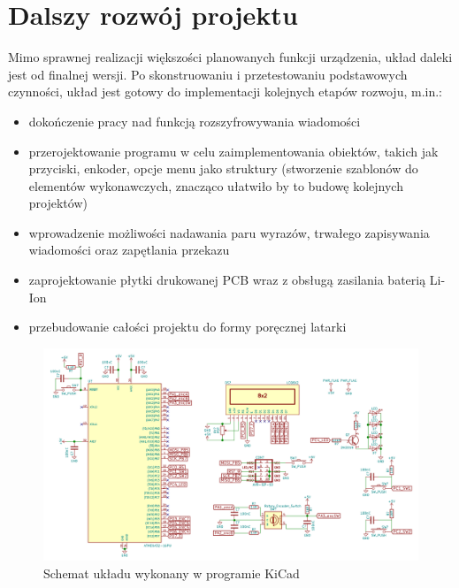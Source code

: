 \documentclass{article}
\begin{document}
\section{Dalszy rozwój projektu}
Mimo sprawnej realizacji większości planowanych funkcji urządzenia, układ daleki jest od finalnej wersji. Po skonstruowaniu i przetestowaniu podstawowych czynności, układ jest gotowy do implementacji kolejnych etapów rozwoju, m.in.:
	\begin{itemize}
	\item dokończenie pracy nad funkcją rozszyfrowywania wiadomości
	
	\item przerojektowanie programu w celu zaimplementowania obiektów, takich jak przyciski, enkoder, opcje menu jako struktury (stworzenie szablonów do elementów wykonawczych, znacząco ułatwiło by to budowę kolejnych projektów)
	
	\item wprowadzenie możliwości nadawania paru wyrazów, trwałego zapisywania wiadomości oraz zapętlania przekazu	
	
	\item zaprojektowanie płytki drukowanej PCB wraz z obsługą zasilania baterią Li-Ion
	
	\item przebudowanie całości projektu do formy poręcznej latarki
	\end{itemize}

\begin{figure}
	\centering
	\includegraphics[width=\textwidth]{img/scheme.png}
	\caption{Schemat układu wykonany w programie KiCad}
	\label{fig:schemat1}
\end{figure}
\end{document}
